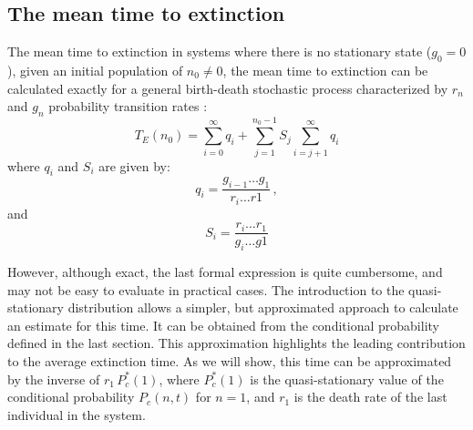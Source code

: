 \subsection{The mean time to extinction}
\label{T_E_Approx}
The mean time to extinction in systems where there is no stationary state ($g_0 = 0$), given an initial population of $n_0\not=0$, the mean time to extinction can be calculated exactly for a general birth-death stochastic process characterized by $r_n$ and $g_n$ probability transition rates \citep{Nisbet82}:
\begin{equation}
T_E(n_0) = \sum_{i=0}^\infty q_{i} + \sum_{j=1}^{n_0-1}S_{j}\sum_{i=j+1}^\infty q_i  
\end{equation}
where $q_{i}$ and $S_i$ are given by:
\begin{equation}
q_i = \frac{g_{i-1}\dots g_{1}}{r_i\dots r{1}}\,, 
\end{equation}
and
\begin{equation}
S_i = \frac{r_{i}\dots r_{1}}{g_{i}\dots g{1}}
\end{equation}

However, although exact, the last formal expression is quite cumbersome, and may not be easy to evaluate in practical cases. The introduction to the quasi-stationary distribution allows a simpler, but approximated approach to calculate an estimate for this time. It can be obtained from the conditional probability defined in the last section. This approximation highlights the leading contribution to the average extinction time. As we will show, this time can be approximated by the inverse of $r_1\,P_c^{*}(1)$, where $P_c^{*}(1)$ is the quasi-stationary value of the conditional probability $P_c(n,t)$ for $n=1$, and $r_1$ is the death rate of the last individual in the system. 

